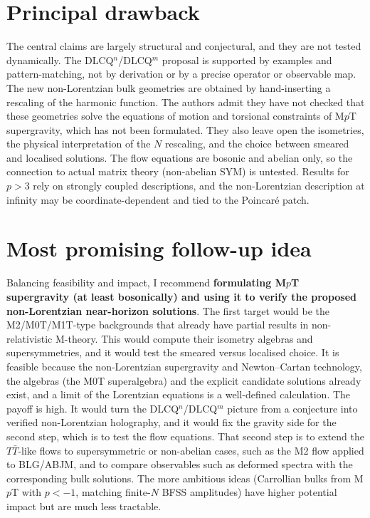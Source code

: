 \documentclass[11pt]{article}
\begin{document}
\section{Principal drawback}
The central claims are largely structural and conjectural, and they are not tested dynamically. The DLCQ$^n$/DLCQ$^m$ proposal is supported by examples and pattern-matching, not by derivation or by a precise operator or observable map. The new non-Lorentzian bulk geometries are obtained by hand-inserting a rescaling of the harmonic function. The authors admit they have not checked that these geometries solve the equations of motion and torsional constraints of M$p$T supergravity, which has not been formulated. They also leave open the isometries, the physical interpretation of the $N$ rescaling, and the choice between smeared and localised solutions. The flow equations are bosonic and abelian only, so the connection to actual matrix theory (non-abelian SYM) is untested. Results for $p>3$ rely on strongly coupled descriptions, and the non-Lorentzian description at infinity may be coordinate-dependent and tied to the Poincar\'e patch.

\section{Most promising follow-up idea}
Balancing feasibility and impact, I recommend \textbf{formulating M$p$T supergravity (at least bosonically) and using it to verify the proposed non-Lorentzian near-horizon solutions}. The first target would be the M2/M0T/M1T-type backgrounds that already have partial results in non-relativistic M-theory. This would compute their isometry algebras and supersymmetries, and it would test the smeared versus localised choice. It is feasible because the non-Lorentzian supergravity and Newton--Cartan technology, the algebras (the M0T superalgebra) and the explicit candidate solutions already exist, and a limit of the Lorentzian equations is a well-defined calculation. The payoff is high. It would turn the DLCQ$^n$/DLCQ$^m$ picture from a conjecture into verified non-Lorentzian holography, and it would fix the gravity side for the second step, which is to test the flow equations. That second step is to extend the $T\bar T$-like flows to supersymmetric or non-abelian cases, such as the M2 flow applied to BLG/ABJM, and to compare observables such as deformed spectra with the corresponding bulk solutions. The more ambitious ideas (Carrollian bulks from M$p$T with $p<-1$, matching finite-$N$ BFSS amplitudes) have higher potential impact but are much less tractable.
\end{document}
